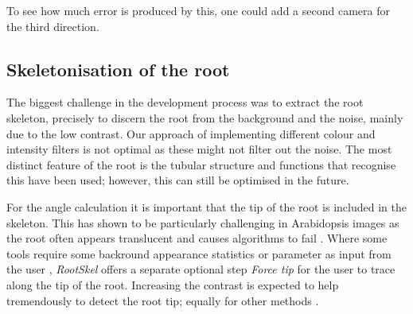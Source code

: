 To see how much error is produced by this, one could add a second camera for the third direction.


\subsection{Skeletonisation of the root}

The biggest challenge in the development process was to extract the root skeleton, precisely to discern the root from the background and the noise, mainly due to the low contrast. %
Our approach of implementing different colour and intensity filters is not optimal as these might not filter out the noise. 
The most distinct feature of the root is the tubular structure and functions that recognise this have been used; however, this can still be optimised in the future. 


For the angle calculation it is important that the tip of the root is included in the skeleton. This has shown to be particularly challenging in Arabidopsis images as the root often appears translucent \cite{french2009high} and causes algorithms to fail \cite{french2009high}. Where some tools require some backround appearance statistics or parameter as input from the user \cite{french2009high}, \textit{RootSkel} offers a separate optional step \textit{Force tip} for the user to trace along the tip of the root. Increasing the contrast is expected to help tremendously to detect the root tip; equally for other methods \cite{french2009high}.



